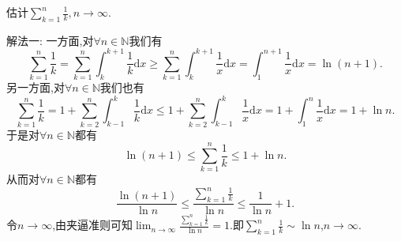 \documentclass[../../main.tex]{subfiles}%
\begin{document}
\begin{example}\label{example:4.461111}
估计$\sum\limits_{k=1}^n{\frac{1}{k}},n\rightarrow \infty $.
\end{example}
\begin{solution}

{\color{blue}解法一:}
一方面,对\(\forall n\in\mathbb{N}\)我们有
\[
\sum\limits_{k = 1}^n\frac{1}{k}=\sum\limits_{k = 1}^n\int_{k}^{k + 1}\frac{1}{k}\mathrm{d}x\geqslant\sum\limits_{k = 1}^n\int_{k}^{k + 1}\frac{1}{x}\mathrm{d}x=\int_{1}^{n + 1}\frac{1}{x}\mathrm{d}x=\ln(n + 1).
\]
另一方面,对\(\forall n\in\mathbb{N}\)我们也有
\[
\sum\limits_{k = 1}^n\frac{1}{k}=1+\sum\limits_{k = 2}^n\int_{k - 1}^{k}\frac{1}{k}\mathrm{d}x\leqslant1+\sum\limits_{k = 2}^n\int_{k - 1}^{k}\frac{1}{x}\mathrm{d}x=1+\int_{1}^{n}\frac{1}{x}\mathrm{d}x=1+\ln n.
\]
于是对\(\forall n\in\mathbb{N}\)都有
\[
\ln(n + 1)\leqslant\sum\limits_{k = 1}^n\frac{1}{k}\leqslant1+\ln n.
\]
从而对\(\forall n\in\mathbb{N}\)都有
\[
\frac{\ln(n + 1)}{\ln n}\leqslant\frac{\sum\limits_{k = 1}^n\frac{1}{k}}{\ln n}\leqslant\frac{1}{\ln n}+1.
\]
令\(n\rightarrow\infty\),由夹逼准则可知\(\lim_{n\rightarrow\infty}\frac{\sum\limits_{k = 1}^n\frac{1}{k}}{\ln n}=1\).即\(\sum\limits_{k = 1}^n\frac{1}{k}\sim\ln n\),\(n\rightarrow\infty\).


\end{solution}
\end{document}
